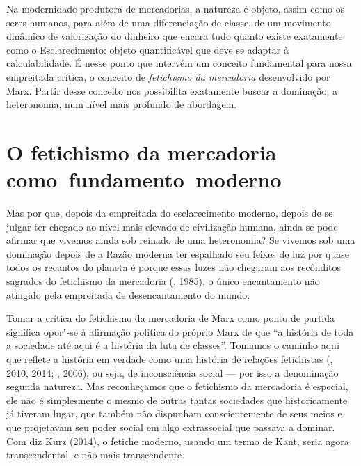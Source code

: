 Na modernidade produtora de mercadorias, a natureza é objeto, assim como
os seres humanos, para além de uma diferenciação de classe, de um
movimento dinâmico de valorização do dinheiro que encara tudo quanto
existe exatamente como o Esclarecimento: objeto quantificável que deve
se adaptar à calculabilidade. É nesse ponto que intervém um conceito
fundamental para nossa empreitada crítica, o conceito de
\emph{fetichismo da mercadoria} desenvolvido por Marx. Partir desse
conceito nos possibilita exatamente buscar a dominação, a heteronomia,
num nível mais profundo de abordagem.

\section*{O fetichismo da mercadoria como~fundamento~moderno}

Mas por que, depois da empreitada do esclarecimento moderno, depois de
se julgar ter chegado ao nível mais elevado de civilização humana, ainda
se pode afirmar que vivemos ainda sob reinado de uma heteronomia? Se
vivemos sob uma dominação depois de a Razão moderna ter espalhado seu
feixes de luz por quase todos os recantos do planeta é porque essas
luzes não chegaram aos recônditos sagrados do fetichismo da mercadoria
(, 1985), o único encantamento não atingido pela empreitada de
desencantamento do mundo.

Tomar a crítica do fetichismo da mercadoria de Marx como ponto de
partida significa opor"-se à afirmação política do próprio Marx de que
``a história de toda a sociedade até aqui é a história da luta de
classes''. Tomamos o caminho aqui que reflete a história em verdade como
uma história de relações fetichistas (, 2010, 2014; , 2006), ou
seja, de inconsciência social --- por isso a denominação segunda
natureza. Mas reconheçamos que o fetichismo da mercadoria é especial,
ele não é simplesmente o mesmo de outras tantas sociedades que
historicamente já tiveram lugar, que também não dispunham
conscientemente de seus meios e que projetavam seu poder social em algo
extrassocial que passava a dominar. Com diz Kurz (2014), o fetiche
moderno, usando um termo de Kant, seria agora transcendental, e não mais
transcendente.


